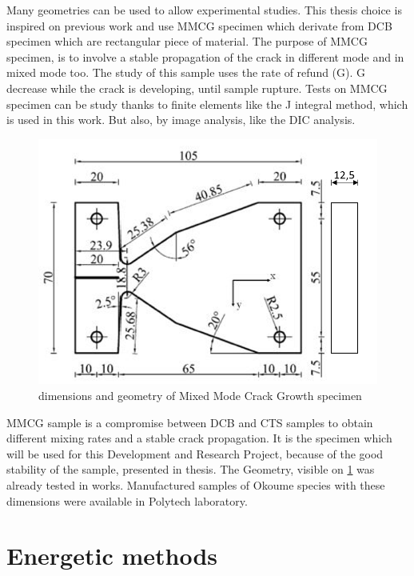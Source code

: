 Many geometries can be used to allow experimental studies. This thesis choice is inspired on previous work and use MMCG specimen which derivate from DCB specimen which are rectangular piece of material. The purpose of MMCG specimen, \parencite{Reference6} is to involve a stable propagation of the crack in different mode and in mixed mode too. The study of this sample uses the rate of refund (G). G decrease while the crack is developing, until sample rupture. Tests on MMCG specimen can be study thanks to finite elements like the J integral method, which is used in this work. But also, by image analysis, like the DIC analysis.
\begin{figure}[th]
	\centering
	\includegraphics[scale=1.1]{Figures/MMCG_specimen}
	\decoRule
	\caption[MMCG specimen]{dimensions and geometry of Mixed Mode Crack Growth specimen}
	\label{fig:Fig5}
\end{figure}
MMCG sample is a compromise between DCB and CTS samples to obtain different mixing rates and a stable crack propagation. It is the specimen which will be used for this Development and Research Project, because of the good stability of the sample, presented in \parencite{Reference6} thesis. The Geometry, visible on \ref{fig:Fig5} was already tested in \parencite{Reference7} works. Manufactured samples of Okoume species with these dimensions were available in Polytech laboratory.


\section{Energetic methods}

